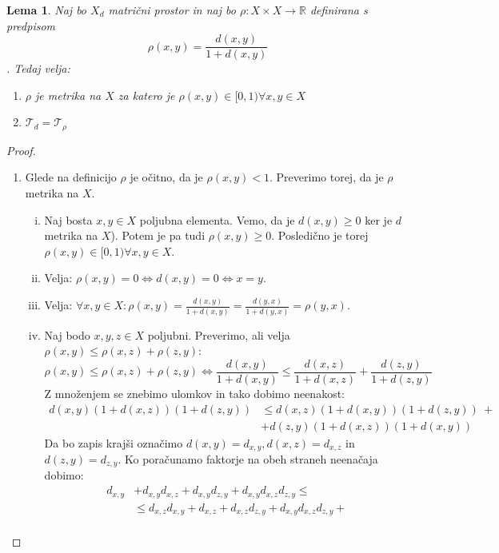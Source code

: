 \documentclass[a4paper, 10pt]{article}
\newtheorem{lema}{Lema}
\newcommand{\mth}[1]{\ensuremath{\mathbb{#1}}}
\newcommand{\R}{\mth{R}}
\newcommand{\map}[3]{\ensuremath{{#1}: {#2} \rightarrow {#3}}}
\begin{document}
	\begin{lema}
		Naj bo $X_d$ matrični prostor in naj bo $\map{\rho}{X\times X}{\R}$ definirana s predpisom $$\rho(x, y) = \frac{d(x, y)}{1 + d(x, y)} $$. Tedaj velja: \begin{enumerate}
			\item $\rho$ je metrika na $X$ za katero je $\rho(x, y) \in [0, 1)\forall x, y\in X$
			\item $\mathcal{T}_d = \mathcal{T}_\rho$
		\end{enumerate}
	\end{lema}
	\begin{proof}
		\begin{enumerate}
			\item Glede na definicijo $\rho$ je očitno, da je $\rho(x, y) < 1$. Preverimo torej, da je $\rho$ metrika na $X$. \begin{enumerate}[i)]
				\item Naj bosta $x, y\in X$ poljubna elementa. Vemo, da je $d(x, y) \geq 0$ ker je $d$ metrika na $X$). Potem je pa tudi $\rho(x, y) \geq 0$. Posledično je torej $\rho(x, y)\in [0, 1) \forall x, y \in X$.
				\item Velja: $\rho(x, y) = 0 \iff d(x, y) = 0 \iff x = y$.
				\item Velja: $\forall x, y \in X: \rho(x, y) = \frac{d(x, y)}{1 + d(x, y)} = \frac{d(y, x)}{1 + d(y, x)} = \rho(y, x)$.
				\item  Naj bodo $x, y, z \in X$ poljubni. Preverimo, ali velja $\rho(x, y) \leq \rho(x, z)+ \rho(z, y)$: \begin{equation*}
					\rho(x, y) \leq \rho(x, z) + \rho(z, y) \iff \frac{d(x, y)}{1 + d(x, y)} \leq \frac{d(x, z)}{1 + d(x, z)} + \frac{d(z, y)}{1 + d(z, y)}
				\end{equation*}
				Z množenjem se znebimo ulomkov in tako dobimo neenakost:
				\begin{align*}
					d(x, y)(1 + d(x, z))(1 + d(z, y)) &\leq d(x, z)(1 + d(x, y))(1 + d(z, y)) ~+ \\ &+ d(z, y)(1 + d(x, z))(1 + d(x, y)) 	
				\end{align*}
				Da bo zapis krajši označimo $d(x, y) = d_{x, y}, d(x, z) = d_{x, z}$ in $d(z, y) = d_{z, y}$. Ko poračunamo faktorje na obeh straneh neenačaja dobimo:
				\begin{align*}
					d_{x, y} &+ d_{x, y}d_{x, z} + d_{x, y}d_{z, y} + d_{x, y}d_{x, z}d_{z, y} \leq \\
					&\leq d_{x, z}d_{x, y} + d_{x, z} + d_{x, z}d_{z, y} + d_{x, y}d_{x, z}d_{z, y} + \\

\end{align*}
\end{enumerate}
\end{enumerate}
\end{proof}
\end{document}
